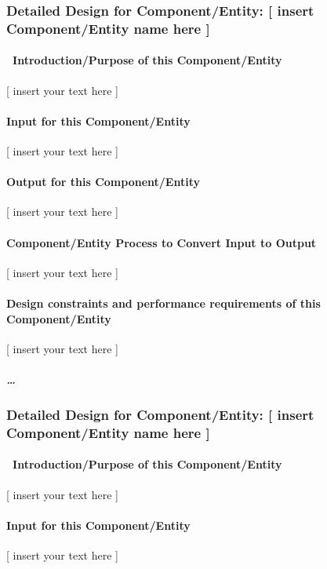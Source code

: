 \documentclass[twoside,letterpaper]{article}
\begin{document}
\subsubsection{Detailed Design for Component/Entity: [ insert
Component/Entity name here ]}
\paragraph[\ Introduction/Purpose of this
Component/Entity]{\ Introduction/Purpose of this Component/Entity}
{\color{black}
[ insert your text here ]}

\paragraph{Input for this Component/Entity}
{\color{black}
[ insert your text here ]}

\paragraph{Output for this Component/Entity}
{\color{black}
[ insert your text here ]}

\paragraph{Component/Entity Process to Convert Input to Output}
{\color{black}
[ insert your text here ]}

\paragraph{Design constraints and performance requirements of this
Component/Entity}
{\color{black}
[ insert your text here ]}

\subparagraph[{\dots}]{{\dots}}
\subsubsection{Detailed Design for Component/Entity: [ insert
Component/Entity name here ]}
\paragraph[\ Introduction/Purpose of this
Component/Entity]{\ Introduction/Purpose of this Component/Entity}
{\color{black}
[ insert your text here ]}

\paragraph{Input for this Component/Entity}
{\color{black}
[ insert your text here ]}
\end{document}
